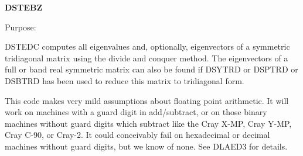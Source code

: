 {\bfseries D\+S\+T\+E\+B\+Z} 

 \begin{DoxyParagraph}{Purpose\+: }
\begin{DoxyVerb} DSTEDC computes all eigenvalues and, optionally, eigenvectors of a
 symmetric tridiagonal matrix using the divide and conquer method.
 The eigenvectors of a full or band real symmetric matrix can also be
 found if DSYTRD or DSPTRD or DSBTRD has been used to reduce this
 matrix to tridiagonal form.

 This code makes very mild assumptions about floating point
 arithmetic. It will work on machines with a guard digit in
 add/subtract, or on those binary machines without guard digits
 which subtract like the Cray X-MP, Cray Y-MP, Cray C-90, or Cray-2.
 It could conceivably fail on hexadecimal or decimal machines
 without guard digits, but we know of none.  See DLAED3 for details.\end{DoxyVerb}
 
\end{DoxyParagraph}

